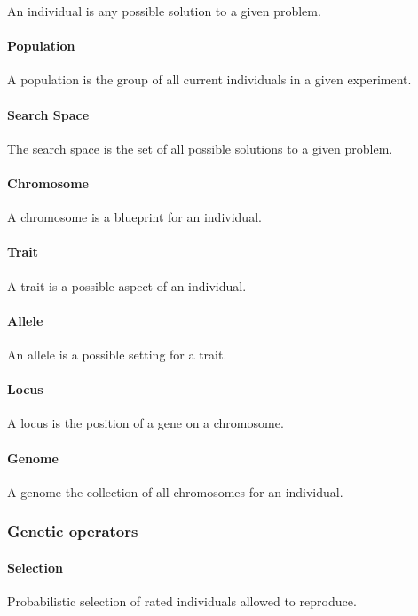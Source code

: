 An individual is any possible solution to a given problem.

\paragraph{Population}

A population is the group of all current individuals in a given experiment.

\paragraph{Search Space}

The search space is the set of all possible solutions to a given problem.

\paragraph{Chromosome}

A chromosome is a blueprint for an individual.

\paragraph{Trait}

A trait is a possible aspect of an individual.

\paragraph{Allele}

An allele is a possible setting for a trait.

\paragraph{Locus}

A locus is the position of a gene on a chromosome.

\paragraph{Genome}

A genome the collection of all chromosomes for an individual.

\subsubsection{Genetic operators}

\paragraph{Selection}
Probabilistic selection of rated individuals allowed to reproduce.

